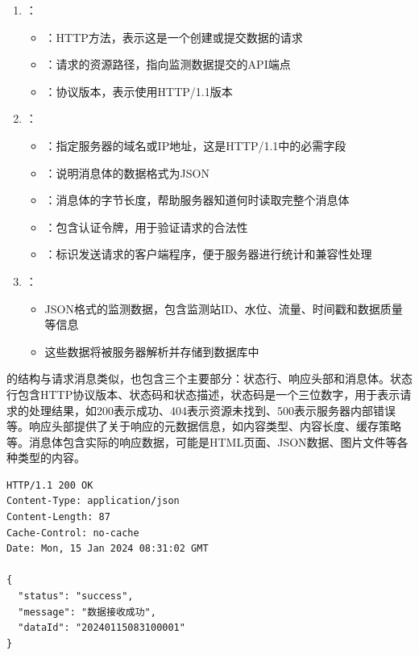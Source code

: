 \begin{enumerate}
\def\labelenumi{\arabic{enumi}.}
\tightlist
\item
  ：

  \begin{itemize}
  \tightlist
  \item
    ：HTTP方法，表示这是一个创建或提交数据的请求
  \item
    ：请求的资源路径，指向监测数据提交的API端点
  \item
    ：协议版本，表示使用HTTP/1.1版本
  \end{itemize}
\item
  ：

  \begin{itemize}
  \tightlist
  \item
    ：指定服务器的域名或IP地址，这是HTTP/1.1中的必需字段
  \item
    ：说明消息体的数据格式为JSON
  \item
    ：消息体的字节长度，帮助服务器知道何时读取完整个消息体
  \item
    ：包含认证令牌，用于验证请求的合法性
  \item
    ：标识发送请求的客户端程序，便于服务器进行统计和兼容性处理
  \end{itemize}
\item
  ：

  \begin{itemize}
  \tightlist
  \item
    JSON格式的监测数据，包含监测站ID、水位、流量、时间戳和数据质量等信息
  \item
    这些数据将被服务器解析并存储到数据库中
  \end{itemize}
\end{enumerate}

的结构与请求消息类似，也包含三个主要部分：状态行、响应头部和消息体。状态行包含HTTP协议版本、状态码和状态描述，状态码是一个三位数字，用于表示请求的处理结果，如200表示成功、404表示资源未找到、500表示服务器内部错误等。响应头部提供了关于响应的元数据信息，如内容类型、内容长度、缓存策略等。消息体包含实际的响应数据，可能是HTML页面、JSON数据、图片文件等各种类型的内容。

\begin{lstlisting}
HTTP/1.1 200 OK
Content-Type: application/json
Content-Length: 87
Cache-Control: no-cache
Date: Mon, 15 Jan 2024 08:31:02 GMT

{
  "status": "success",
  "message": "数据接收成功",
  "dataId": "20240115083100001"
}
\end{lstlisting}

